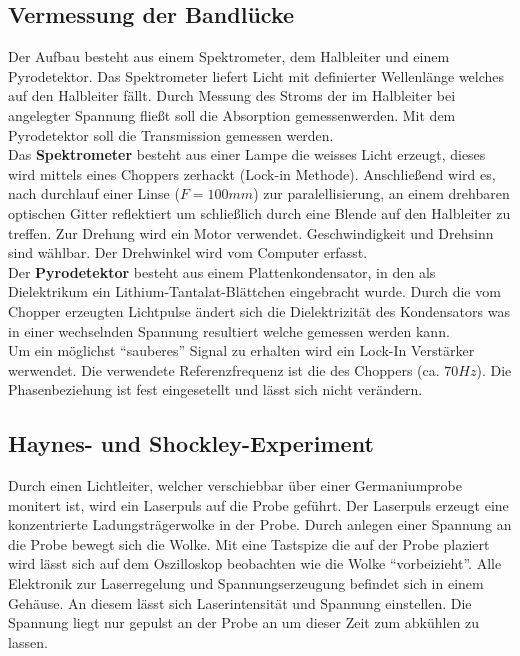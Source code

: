 \documentclass[12pt]{article}
\begin{document}
\subsection{Vermessung der Bandlücke}
Der Aufbau besteht aus einem Spektrometer, dem Halbleiter und einem Pyrodetektor.
Das Spektrometer liefert Licht mit definierter Wellenlänge welches auf den Halbleiter fällt. Durch Messung des Stroms der im Halbleiter bei angelegter Spannung fließt soll die Absorption gemessenwerden. Mit dem Pyrodetektor soll die Transmission gemessen werden.\\

Das \textbf{Spektrometer} besteht aus einer Lampe die weisses Licht erzeugt, dieses wird mittels eines Choppers zerhackt (Lock-in Methode). Anschließend wird es, nach durchlauf einer Linse ($F = 100mm$) zur paralellisierung, an einem drehbaren optischen Gitter reflektiert um schließlich durch eine Blende auf den Halbleiter zu treffen. Zur Drehung wird ein Motor verwendet. Geschwindigkeit und Drehsinn sind wählbar. Der Drehwinkel wird vom Computer erfasst.\\

Der \textbf{Pyrodetektor} besteht aus einem Plattenkondensator, in den als Dielektrikum ein Lithium-Tantalat-Blättchen eingebracht wurde. Durch die vom Chopper erzeugten Lichtpulse ändert sich die Dielektrizität des Kondensators was in einer wechselnden Spannung resultiert welche gemessen werden kann.\\

Um ein möglichst "`sauberes"' Signal zu erhalten wird ein Lock-In Verstärker werwendet.
Die verwendete Referenzfrequenz ist die des Choppers (ca. $70Hz$). Die Phasenbeziehung ist fest eingesetellt und lässt sich nicht verändern.

\subsection{Haynes- und Shockley-Experiment}
Durch einen Lichtleiter, welcher verschiebbar über einer Germaniumprobe monitert ist, wird ein Laserpuls auf die Probe geführt.
Der Laserpuls erzeugt eine konzentrierte Ladungsträgerwolke in der Probe. Durch anlegen einer Spannung an die Probe bewegt sich die Wolke. Mit eine Tastspize die auf der Probe plaziert wird lässt sich auf dem Oszilloskop beobachten wie die Wolke "`vorbeizieht"'. Alle Elektronik zur Laserregelung und Spannungserzeugung befindet sich in einem Gehäuse. An diesem lässt sich Laserintensität und Spannung einstellen. Die Spannung liegt nur gepulst an der Probe an um dieser Zeit zum abkühlen zu lassen.\\
\end{document}

